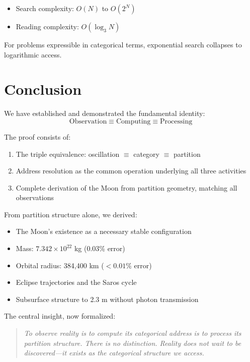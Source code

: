 \documentclass[12pt,a4paper]{article}
\theoremstyle{definition}
\theoremstyle{remark}
\begin{document}
\begin{itemize}
    \item Search complexity: $O(N)$ to $O(2^N)$
    \item Reading complexity: $O(\log_3 N)$
\end{itemize}

For problems expressible in categorical terms, exponential search collapses to logarithmic access.

\section{Conclusion}
\label{sec:conclusion}

We have established and demonstrated the fundamental identity:
\begin{equation}
\boxed{\text{Observation} \equiv \text{Computing} \equiv \text{Processing}}
\end{equation}

The proof consists of:
\begin{enumerate}
    \item The triple equivalence: oscillation $\equiv$ category $\equiv$ partition
    \item Address resolution as the common operation underlying all three activities
    \item Complete derivation of the Moon from partition geometry, matching all observations
\end{enumerate}

From partition structure alone, we derived:
\begin{itemize}
    \item The Moon's existence as a necessary stable configuration
    \item Mass: $7.342 \times 10^{22}$ kg (0.03\% error)
    \item Orbital radius: 384,400 km ($<0.01\%$ error)
    \item Eclipse trajectories and the Saros cycle
    \item Subsurface structure to 2.3 m without photon transmission
\end{itemize}

The central insight, now formalized:

\begin{quote}
\emph{To observe reality is to compute its categorical address is to process its partition structure. There is no distinction. Reality does not wait to be discovered---it exists as the categorical structure we access.}
\end{quote}
\end{document}
